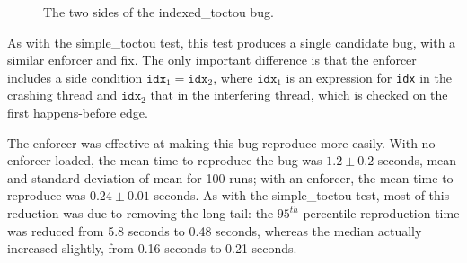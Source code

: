 \begin{figure}
  \caption{The two sides of the indexed\_toctou bug.}
  \label{fig:eval:indexed_toctou}
\end{figure}

As with the simple\_toctou test, this test produces a single candidate
bug, with a similar enforcer and fix.  The only important difference
is that the enforcer includes a side condition $\mathtt{idx}_1 =
\mathtt{idx}_2$, where $\mathtt{idx}_1$ is an expression for
\texttt{idx} in the crashing thread and $\mathtt{idx}_2$ that in the
interfering thread, which is checked on the first happens-before edge.

The enforcer was effective at making this bug reproduce more easily.
With no enforcer loaded, the mean time to reproduce the bug was $1.2
\pm 0.2$ seconds, mean and standard deviation of mean for 100 runs;
with an enforcer, the mean time to reproduce was $0.24 \pm 0.01$
seconds.  As with the simple\_toctou test, most of this reduction was
due to removing the long tail: the $95^{th}$ percentile reproduction
time was reduced from 5.8 seconds to 0.48 seconds, whereas the median
actually increased slightly, from 0.16 seconds to 0.21 seconds.


